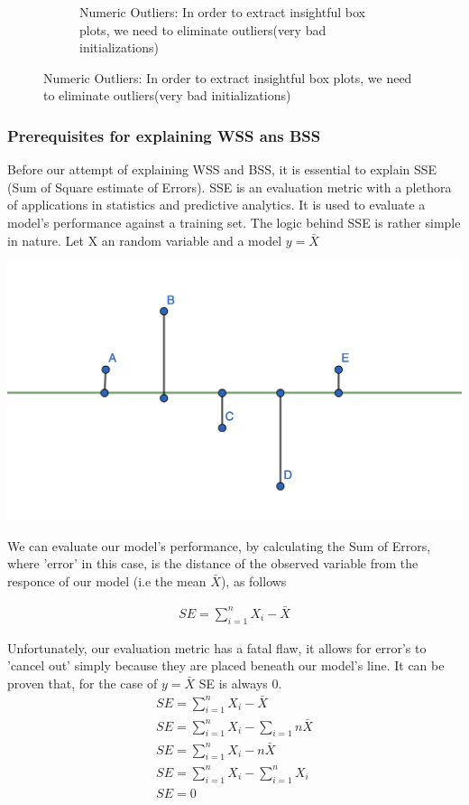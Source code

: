 \documentclass[11pt]{article}
\begin{document}
\begin{figure}[H]
\begin{subfigure}{0.4\textwidth}
					\caption{Numeric Outliers: In order to extract insightful box plots, we need to eliminate outliers(very bad initializations)}
					\label{fig:first}
				\end{subfigure}
					\label{fig:figures}
			\end{figure}
			\fi
			
			\subsubsection*{Prerequisites for explaining WSS ans BSS}
				Before our attempt of explaining WSS and BSS, it is essential to explain SSE (Sum of Square estimate of Errors). SSE is an evaluation metric with a plethora of applications in statistics and predictive analytics\cite{???}. It is used to evaluate a model's performance against a training set\cite{???}. The logic behind SSE is rather simple in nature. Let X an random variable and a model $y=\bar{X}$
				\iftrue
				\begin{center}
					\includegraphics[scale=0.5]{res/t1/t15/t15-SSE}				
				\end{center}
				\fi
				We can evaluate our model's performance, by calculating the Sum of Errors, where 'error' in this case, is the distance of the observed variable from the responce of our model (i.e the mean $\bar{X}$), as follows
				\iftrue
				\begin{align}
					SE = \sum_{i=1}^{n}{X_i-\bar{X}}
				\end{align}
				\fi
				Unfortunately, our evaluation metric has a fatal flaw, it allows for error's to 'cancel out' simply because they are placed beneath our model's line. It can be proven that, for the case of $y=\bar{X}$ SE is always 0.
				\iftrue
				\begin{align}
					SE = \sum_{i=1}^{n}{X_i-\bar{X}} \\
					SE = \sum_{i=1}^{n}{X_i} - \sum_{i=1}{n}{\bar{X}} \\
					SE = \sum_{i=1}^{n}{X_i} - n\bar{X} \\
					SE = \sum_{i=1}^{n}{X_i} - \sum_{i=1}^{n}{X_i} \\
					SE = 0 \\
				\end{align}
\end{document}
